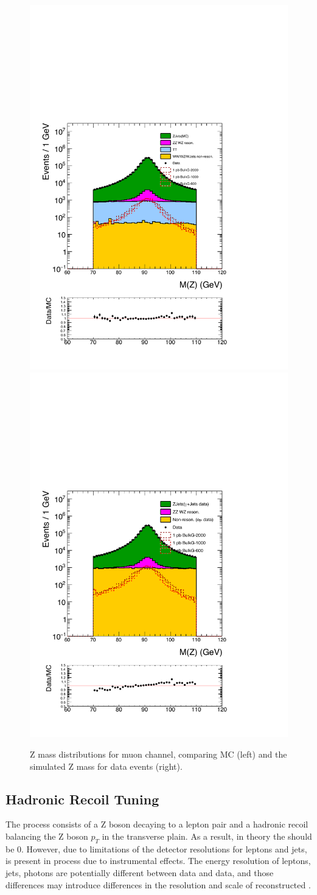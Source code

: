\begin{figure}[htbp!]
\centering
\includegraphics[width=0.46\linewidth]{figures/MC2_Rc36p46DtReCalib_RhoWt_GMCEtaWt_tightzpt50_puWeightmoriondMC_metfilter_mu_log_1pb.pdf}
\includegraphics[width=0.46\linewidth]{figures/GJets2_BkgSub_Rc36p46DtReCalib_NonReso_RhoWt_GMCEtaWt_tightzpt50_puWeightmoriondMC_muoneg_gjet_metfilter_mu_log_1pb.pdf}
\caption{Z mass distributions for muon channel, comparing \Zjets MC (left) and the simulated Z mass for \gjets data events (right).}
\label{fig:mz_mu_zjets_gjets}
\end{figure}

\subsection{\boldmath{\ptmiss} Hadronic Recoil Tuning}\label{sec:gjetmet}
The \Zjets process consists of a Z boson decaying to a lepton pair and a hadronic recoil balancing the Z boson $p_T$ in the transverse plain. As a result, in theory the \ptmiss should be 0. However, due to limitations of the detector resolutions for leptons and jets, \ptmiss is present in \Zjets process due to instrumental effects. The energy resolution of leptons, jets, photons are potentially different between \gjets data and \Zjets data, and those differences may introduce differences in the resolution and scale of reconstructed \ptmiss.

